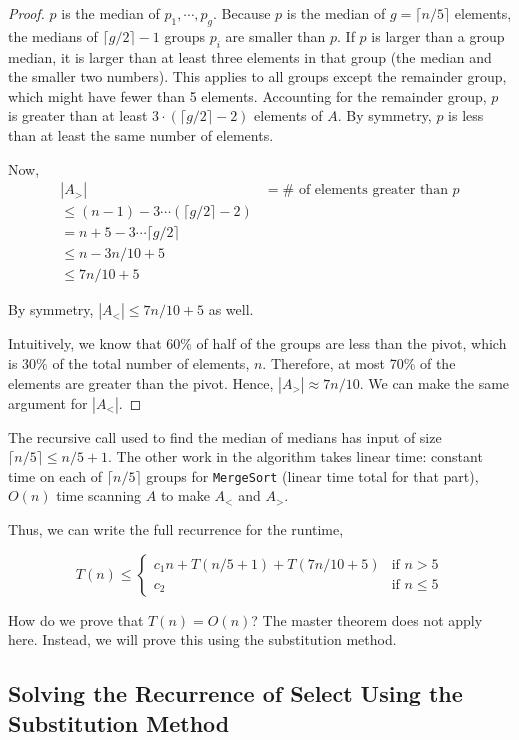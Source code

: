 \documentclass [12pt]{article}
\begin{document}
\begin{proof}
$p$ is the median of $p_1, \cdots , p_g$. Because $p$ is the median of $g = \lceil n/5 \rceil$ elements, the medians of $\lceil g/2 \rceil-1$ groups $p_i$ are smaller than $p$. If $p$ is larger than a group median, it is larger than at least three elements in that group (the median and the smaller two numbers). This
applies to all groups except the remainder group, which might have fewer than 5 elements. Accounting for the remainder group, $p$ is greater than at least $3 \cdot (\lceil g/2 \rceil - 2)$ elements of $A$.
By symmetry, $p$ is less than at least the same number of elements.

Now,
\begin{align*}
|A_>| &= \# \text{ of elements greater than } p \\
\leq (n-1) - 3 \cdots (\lceil g / 2 \rceil - 2) \\
= n + 5 - 3 \cdots \lceil g / 2 \rceil \\
\leq n - 3n/10 + 5 \\
\leq 7n/10 + 5
\end{align*}

By symmetry, $|A_<| \leq 7n/10 + 5$ as well.

Intuitively, we know that 60\% of half of the groups are less than the pivot, which is 30\% of the total number of elements, $n$. Therefore, at most 70\% of the elements are greater than the pivot. Hence, $|A_>| \approx 7n/10$. We can make the same argument for $|A_<|$.
\end{proof}

The recursive call used to find the median of medians has input of size $\lceil n/5 \rceil \leq n/5 + 1$. The other work in the algorithm takes linear time: constant time on each of $\lceil n/5 \rceil$ groups for \texttt{MergeSort} (linear time total for that part), $O(n)$ time scanning $A$ to make $A_<$ and $A_>$.

Thus, we can write the full recurrence for the runtime,

$$
T(n) \leq \begin{cases}
    c_1n + T(n/5 + 1) + T(7n/10 + 5) & \text{if } n > 5 \\
    c_2 & \text{if } n \leq 5
\end{cases}
$$

How do we prove that $T(n) = O(n)$? The master theorem does not apply here. Instead, we will prove this using the substitution method.

\subsection{Solving the Recurrence of Select Using the Substitution Method}
\end{document}
